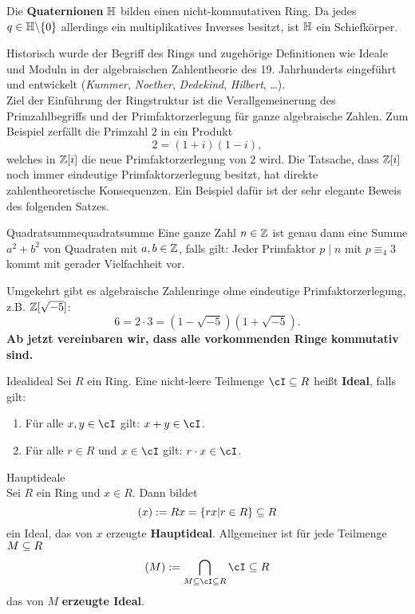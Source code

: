 \begin{beispiel}
Die \textbf{Quaternionen} $\mathbb{H}$ bilden einen nicht-kommutativen Ring. Da jedes $q \in \mathbb{H} \backslash \{0\}$ allerdings ein multiplikatives Inverses besitzt, ist $\mathbb{H}$ ein Schiefkörper.
\end{beispiel}
\begin{bemerkung}
Historisch wurde der Begriff des Rings und zugehörige Definitionen wie Ideale und Moduln in der algebraischen Zahlentheorie des 19. Jahrhunderts eingeführt und entwickelt (\textit{Kummer}, \textit{Noether}, \textit{Dedekind}, \textit{Hilbert}, \dots).\\
Ziel der Einführung der Ringstruktur ist die Verallgemeinerung des Primzahlbegriffs und der Primfaktorzerlegung für ganze algebraische Zahlen. Zum Beispiel zerfällt die Primzahl $2$ in ein Produkt
\begin{equation}
2 = (1+i)(1-i),
\end{equation}
welches in $\mathbb{Z}[i]$ die neue Primfaktorzerlegung von $2$ wird. Die Tatsache, dass $\mathbb{Z}[i]$ noch immer eindeutige Primfaktorzerlegung besitzt, hat direkte zahlentheoretische Konsequenzen. Ein Beispiel dafür ist der sehr elegante Beweis des folgenden Satzes.
\end{bemerkung}
\begin{satz}{Quadratsumme}{quadratsumme}
Eine ganze Zahl $n \in \mathbb{Z}$ ist genau dann eine Summe $a^2+b^2$ von Quadraten mit $a,b \in \mathbb{Z}$, falls gilt: Jeder Primfaktor $p \mid n$ mit $ p \equiv_4 3$ kommt mit gerader Vielfachheit vor. 
\end{satz}
Umgekehrt gibt es algebraische Zahlenringe ohne eindeutige Primfaktorzerlegung, z.B. $\mathbb{Z} [\sqrt{-5}]$:
\begin{equation}
6 = 2 \cdot 3 = (1-\sqrt{-5})(1+\sqrt{-5}).
\end{equation}
\textbf{Ab jetzt vereinbaren wir, dass alle vorkommenden Ringe kommutativ sind.}
\begin{definition}{Ideal}{ideal}
Sei $R$ ein Ring. Eine nicht-leere Teilmenge $\cI \sub R$ heißt \textbf{Ideal}, falls gilt:
\begin{enumerate}[({I}1)]
\item Für alle $x, y \in \cI$ gilt: $x+y \in \cI$.
\item Für alle $r \in R$ und $x \in \cI$ gilt: $r \cdot x \in \cI$.
\end{enumerate}
\end{definition}
\begin{beispiel}Hauptideale\\
Sei $R$ ein Ring und $x \in R$. Dann bildet 
\begin{equation}
(x) := Rx = \{rx | r \in R \} \subseteq R
\end{equation}
ein Ideal, das von $x$ erzeugte \textbf{Hauptideal}. Allgemeiner ist für jede Teilmenge $M \subseteq R$ 
\begin{equation}
(M) := \bigcap_{M \sub \cI \sub R} \cI \sub R
\end{equation}
das von $M$ \textbf{erzeugte Ideal}.
\end{beispiel}
